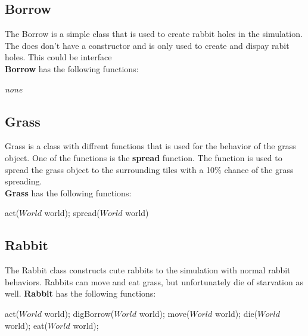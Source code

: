 \documentclass[11pt]{article}
\begin{document}
    \subsection*{Borrow}
    The Borrow is a simple class that is used to create rabbit holes in the simulation. The does don't have a constructor and is only used to create and dispay rabit holes. This could be interface 
    \\
    \textbf{Borrow} has the following functions:
    \begin{mdframed}
        \textit{none}
    \end{mdframed}
    \subsection*{Grass}
    Grass is a class with diffrent functions that is used for the behavior of the grass object. One of the functions is the \textbf{spread} function. The function is used to spread the grass object to the surrounding tiles with a 10$\%$ chance of the grass spreading. 
    \\
    \textbf{Grass} has the following functions:
    \begin{mdframed}
        act($World$ world); spread($World$ world)
    \end{mdframed}
    \newpage
    \subsection*{Rabbit}
    The Rabbit class constructs cute rabbits to the simulation with normal rabbit behaviors. Rabbits can move and eat grass, but unfortunately die of starvation as well. 
    \textbf{Rabbit} has the following functions:
    \begin{mdframed}
        act($World$ world); digBorrow($World$ world); move($World$ world); die($World$ world); eat($World$ world);
    \end{mdframed}
\end{document}
